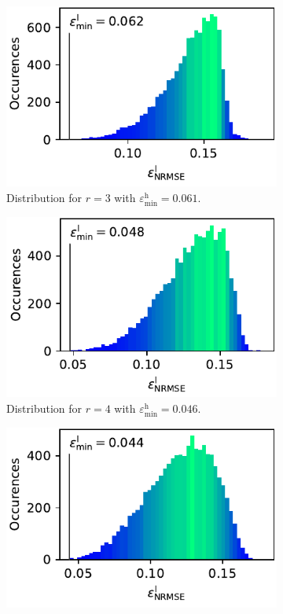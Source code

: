 \documentclass[
  a4paper,  %
  twoside,  %
  bibliography=totoc,
  headsepline,
  cleardoublepage=empty,
  parskip=half,
  draft=false
]{scrbook}
\begin{document}
\begin{mdframed}[style=style]
\begin{figure}[H]
\begin{subfigure}{.5\textwidth}
  \centering
   \includegraphics[width=0.95\linewidth]{graphics/ww_hist_3}
  \caption{Distribution for $r=3$ with $\varepsilon^\mathrm{h}_{\mathrm{min}}=0.061$.}
\vspace{3mm}
\label{fig:wwi_hist_3}
\end{subfigure}%
\begin{subfigure}{.5\textwidth}
  \centering
   \includegraphics[width=0.95\linewidth]{graphics/ww_hist_4}
  \caption{Distribution for $r=4$ with $\varepsilon^\mathrm{h}_{\mathrm{min}}=0.046$.}
\vspace{3mm}
\label{fig:ww_hist_4}
\end{subfigure}%
\vspace{3mm}
\begin{subfigure}{.5\textwidth}
  \centering
   \includegraphics[width=0.95\linewidth]{graphics/ww_hist_5}

\end{subfigure}
\end{figure}
\end{mdframed}
\end{document}

